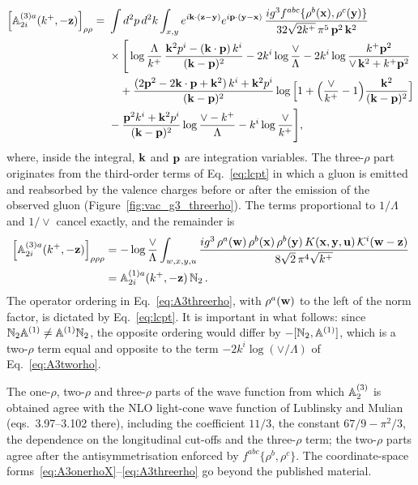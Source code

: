 \begin{align}\label{eq:A3tworho}
\Big[\mathbb{A}^{(3)a}_{2i}(k^+,-\mathbf{z})\Big]_{\rho\rho}=\ &\int d^2p\,d^2k\int_{x,y}e^{i\mathbf{k}\cdot(\mathbf{z}-\mathbf{y})}e^{i\mathbf{p}\cdot(\mathbf{y}-\mathbf{x})}\,\frac{ig^3f^{abc}\{\rho^b(\mathbf{x}),\rho^c(\mathbf{y})\}}{32\sqrt{2k^+}\,\pi^5\,\mathbf{p}^2\,\mathbf{k}^2}
\notag\\&\times\Bigg[\log\frac{\Lambda}{k^+}\,\frac{\mathbf{k}^2p^i-(\mathbf{k}\cdot\mathbf{p})\,k^i}{(\mathbf{k}-\mathbf{p})^2}
-2k^i\log\frac{\vee}{\Lambda}
-2k^i\log\frac{k^+\mathbf{p}^2}{\vee\,\mathbf{k}^2+k^+\mathbf{p}^2}
\notag\\&\quad
+\frac{(2\mathbf{p}^2-2\mathbf{k}\cdot\mathbf{p}+\mathbf{k}^2)\,k^i+\mathbf{k}^2p^i}{(\mathbf{k}-\mathbf{p})^2}\log\Big[1+\Big(\frac{\vee}{k^+}-1\Big)\frac{\mathbf{k}^2}{(\mathbf{k}-\mathbf{p})^2}\Big]
\notag\\&
-\frac{\mathbf{p}^2k^i+\mathbf{k}^2p^i}{(\mathbf{k}-\mathbf{p})^2}\log\frac{\vee-k^+}{\Lambda}-k^i\log\frac{\vee}{k^+}\Bigg],
\end{align}
where, inside the integral, $\mathbf{k}$ and $\mathbf{p}$ are integration variables. The three-$\rho$ part originates from the third-order terms of Eq.~\eqref{eq:lcpt} in which a gluon is emitted and reabsorbed by the valence charges before or after the emission of the observed gluon (Figure~\ref{fig:vac_g3_threerho}). The terms proportional to $1/\Lambda$ and $1/\vee$ cancel exactly, and the remainder is
\begin{align}\label{eq:A3threerho}
\Big[\mathbb{A}^{(3)a}_{2i}(k^+,-\mathbf{z})\Big]_{\rho\rho\rho}&=-\log\frac{\vee}{\Lambda}\int_{w,x,y,u}\frac{ig^3\,\rho^a(\mathbf{w})\,\rho^b(\mathbf{x})\,\rho^b(\mathbf{y})\,K(\mathbf{x},\mathbf{y},\mathbf{u})\,\mathcal{K}^i(\mathbf{w}-\mathbf{z})}{8\sqrt2\,\pi^4\sqrt{k^+}}
\notag\\&=\mathbb{A}^{(1)a}_{2i}(k^+,-\mathbf{z})\,\mathbb{N}_2\,.
\end{align}
The operator ordering in Eq.~\eqref{eq:A3threerho}, with $\rho^a(\mathbf{w})$ to the left of the norm factor, is dictated by Eq.~\eqref{eq:lcpt}. It is important in what follows: since $\mathbb{N}_2\mathbb{A}^{(1)}\neq\mathbb{A}^{(1)}\mathbb{N}_2$, the opposite ordering would differ by $-[\mathbb{N}_2,\mathbb{A}^{(1)}]$, which is a two-$\rho$ term equal and opposite to the term $-2k^i\log(\vee/\Lambda)$ of Eq.~\eqref{eq:A3tworho}.

The one-$\rho$, two-$\rho$ and three-$\rho$ parts of the wave function from which $\mathbb{A}^{(3)}_2$ is obtained agree with the NLO light-cone wave function of Lublinsky and Mulian~\cite{Lublinsky:2016meo} (eqs.~3.97--3.102 there), including the coefficient $11/3$, the constant $67/9-\pi^2/3$, the dependence on the longitudinal cut-offs and the three-$\rho$ term; the two-$\rho$ parts agree after the antisymmetrisation enforced by $f^{abc}\{\rho^b,\rho^c\}$. The coordinate-space forms~\eqref{eq:A3onerhoX}--\eqref{eq:A3threerho} go beyond the published material.

